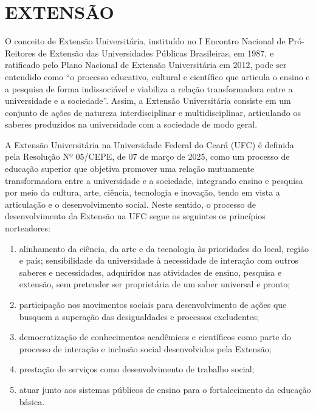 \chapter{EXTENSÃO}
\label{cap:extensao}

O conceito de Extensão Universitária, instituído no I Encontro Nacional de Pró-Reitores de Extensão das Universidades Públicas Brasileiras, em 1987, e ratificado pelo Plano Nacional de Extensão Universitária em 2012, pode ser entendido como ``o processo educativo, cultural e científico que articula o ensino e a pesquisa de forma indissociável e viabiliza a relação transformadora entre a universidade e a sociedade''. Assim, a Extensão Universitária consiste em um conjunto de ações de natureza interdisciplinar e multidisciplinar, articulando os saberes produzidos na universidade com a sociedade de modo geral.

A Extensão Universitária na Universidade Federal do Ceará (UFC) é definida pela Resolução Nº 05/CEPE, de 07 de março de 2025, como um processo de educação superior que objetiva promover uma relação mutuamente transformadora entre a universidade e a sociedade, integrando ensino e pesquisa por meio da cultura, arte, ciência, tecnologia e inovação, tendo em vista a articulação e o desenvolvimento social. 
Neste sentido, o processo de desenvolvimento da Extensão na UFC segue os seguintes os princípios norteadores:%

\begin{enumerate}[label=\Roman* --, leftmargin=*]
    \item alinhamento da ciência, da arte e da tecnologia às prioridades do local, região e país; sensibilidade da universidade à necessidade de interação com outros saberes e necessidades, adquiridos nas atividades de ensino, pesquisa e extensão, sem pretender ser proprietária de um saber universal e pronto; 
    \item participação nos movimentos sociais para desenvolvimento de ações que busquem a superação das desigualdades e processos excludentes; 
    \item democratização de conhecimentos acadêmicos e científicos como parte do processo de interação e inclusão social desenvolvidos pela Extensão; 
    \item prestação de serviços como desenvolvimento de trabalho social; 
    \item atuar junto aos sistemas públicos de ensino para o fortalecimento da educação básica. 
\end{enumerate}



